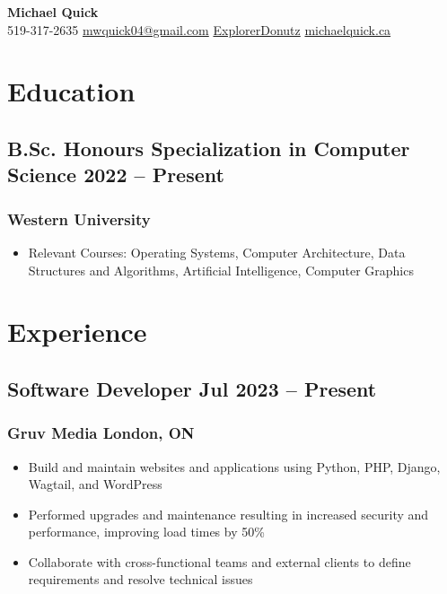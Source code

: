 \documentclass[11pt]{article}
\begin{document}
\begin{center}
  {\fontsize{20}{10}\selectfont \color{accent} \textbf{Michael Quick}}\\[6pt]
  {\color{gray}\faPhone} 519-317-2635
  \quad
  \href{mailto:mwquick04@gmail.com}{{\color{gray}\faEnvelope} mwquick04@gmail.com}
  \quad
  \href{https://github.com/ExplorerDonutz}{{\color{gray}\faGithub} ExplorerDonutz}
  \quad
  \href{https://michaelquick.ca/}{{\color{gray}\faLink} michaelquick.ca}
\end{center}

\section{Education}
\subsection{B.Sc. Honours Specialization in Computer Science  \hfill 2022 -- Present}
\subsubsection{Western University} 
\begin{itemize}[left=0pt..1em]
  \item Relevant Courses: Operating Systems, Computer Architecture, Data Structures and Algorithms, Artificial Intelligence, Computer Graphics
\end{itemize}

\section{Experience}

\subsection{Software Developer \hfill Jul 2023 -- Present}
\subsubsection{Gruv Media \hfill London, ON}
\begin{itemize}[left=0pt..1em]
  \item Build and maintain websites and applications using Python, PHP, Django, Wagtail, and WordPress
  \item Performed upgrades and maintenance resulting in increased security and performance, improving load times by 50\%
  \item Collaborate with cross-functional teams and external clients to define requirements and resolve technical issues
\end{itemize}
\end{document}
